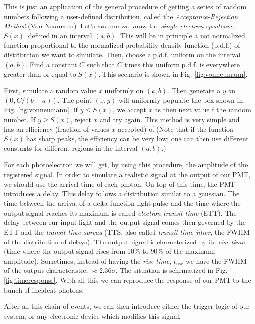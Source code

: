 This is just an application of the general procedure of getting a
series of random numbers following a user-defined distribution, called
the \emph{Acceptance-Rejection Method} (Von Neumann). Let's assume we
know the \emph{single electron spectrum}, $S(x)$, defined in an
interval $(a,b)$. This will be in principle a not normalized function
proportional to the normalized probability density function (p.d.f.)
of distribution we want to simulate. Then, choose a p.d.f. uniform on
the interval $(a,b)$. Find a constant $C$ such that $C$ times this
uniform p.d.f.  is everywhere greater than or equal to $S(x)$. This
scenario is shown in Fig. \ref{fig:vonneumann}.

\vonneumannfig

First, simulate a random value $x$ uniformly on $(a,b)$. Then generate
a $y$ on $(0,C/(b-a))$. The point $(x,y)$ will uniformly populate the
box shown in Fig. \ref{fig:vonneumann}. If $y\le S(x)$, we accept $x$
as then next value f the random number. If $y\geq S(x)$, reject $x$
and try again.  This method is very simple and has an efficiency
(fraction of values $x$ accepted) of
%
\vonneumanneffeq
%
(Note that if the function $S(x)$ has sharp peaks, the efficiency can
be very low; one can then use different constants for different
regions in the interval $(a,b)$.)

\timeresponsefig

For each photoelectron we will get, by using this procedure, the
amplitude of the registered signal. In order to simulate a realistic
signal at the output of our PMT, we should use the arrival time of
each photon. On top of this time, the PMT introduces a delay. This
delay follows a distribution similar to a gaussian. The time between
the arrival of a delta-function light pulse and the time where the
output signal reaches its maximum is called \emph{electron transit
  time} (ETT). The delay between our input light and the output signal
comes then governed by the ETT and the \emph{transit time spread}
(TTS, also called \emph{transit time jitter}, the FWHM of the
distribution of delays). The output signal is characterized by its
\emph{rise time} (time where the output signal rises from 10\% to 90\%
of the maximum amplitude). Sometimes, instead of having the \emph{rise
  time}, $t_{\mathrm{rise}}$ we have the FWHM of the output
characteristic, $\approx 2.36\sigma$. The situation is schematized in
Fig. \ref{fig:timeresponse}. With all this we can reproduce the
response of our PMT to the bunch of incident photons.

After all this chain of events, we can then introduce either the
trigger logic of our system, or any electronic device which modifies
this signal.

